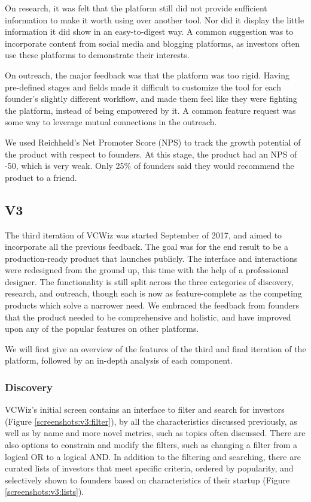 On research, it was felt that the platform still did not provide sufficient information to make it worth using over another tool. Nor did it display the little information it did show in an easy-to-digest way. A common suggestion was to incorporate content from social media and blogging platforms, as investors often use these platforms to demonstrate their interests.

On outreach, the major feedback was that the platform was too rigid. Having pre-defined stages and fields made it difficult to customize the tool for each founder's slightly different workflow, and made them feel like they were fighting the platform, instead of being empowered by it. A common feature request was some way to leverage mutual connections in the outreach.

We used Reichheld's Net Promoter Score (NPS) \cite{reichheld2003one} to track the growth potential of the product with respect to founders. At this stage, the product had an NPS of -50, which is very weak. Only 25\% of founders said they would recommend the product to a friend.

\subsection{V3}

The third iteration of VCWiz was started September of 2017, and aimed to incorporate all the previous feedback. The goal was for the end result to be a production-ready product that launches publicly. The interface and interactions were redesigned from the ground up, this time with the help of a professional designer. The functionality is still split across the three categories of discovery, research, and outreach, though each is now as feature-complete as the competing products which solve a narrower need. We embraced the feedback from founders that the product needed to be comprehensive and holistic, and have improved upon any of the popular features on other platforms.

We will first give an overview of the features of the third and final iteration of the platform, followed by an in-depth analysis of each component.

\subsubsection{Discovery}

VCWiz's initial screen contains an interface to filter and search for investors (Figure \ref{screenshots:v3:filter}), by all the characteristics discussed previously, as well as by name and more novel metrics, such as topics often discussed. There are also options to constrain and modify the filters, such as changing a filter from a logical OR to a logical AND. In addition to the filtering and searching, there are curated lists of investors that meet specific criteria, ordered by popularity, and selectively shown to founders based on characteristics of their startup (Figure \ref{screenshots:v3:lists}).

